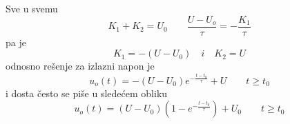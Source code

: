 \begin{frame}[label=08-s048]
\setlength{\parskip}{2pt}
\setlength{\abovedisplayskip}{4pt}\setlength{\belowdisplayskip}{4pt}
Sve u svemu
\[K_1+K_2=U_0\qquad\frac{U-U_o}{\tau}=-\frac{K_1}{\tau}\]
pa je
\[K_1=-(U-U_0)\quad i\quad K_2=U\]
odnosno rešenje za izlazni napon je
\[u_o(t)=-(U-U_0)e^{-\frac{t-t_0}{\tau}}+U\qquad t\geq t_0\]
i dosta često se piše u sledećem obliku
\[u_o(t)=(U-U_0)\left(1-e^{-\frac{t-t_0}{\tau}}\right)+U_0\qquad t\geq t_0\]
\end{frame}
